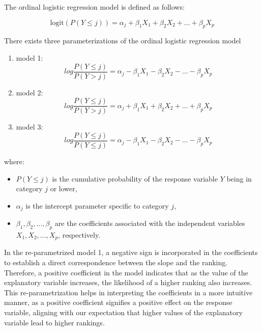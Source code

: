 \documentclass[12pt]{article}
\numberwithin{equation}{section}
\begin{document}
The ordinal logistic regression model is defined as follows:

\begin{equation}
\text{logit}(P(Y \leq j)) = \alpha_j + \beta_1 X_1 + \beta_2 X_2 + \ldots + \beta_p X_p
\label{eq:3.1}
\end{equation}

	There exists three parameterizations of the ordinal logistic regression model 
		\begin{enumerate}
		\item model 1:\\
		\begin{equation}	
	log \frac{P(Y\le j)}{P(Y>j)} = \alpha_j - \beta_1 X_1 - \beta_2 X_2 - \ldots - \beta_p X_p
	\label{eq:3.2}
\end{equation}
		
			\item model 2:\\
			\begin{equation}
			log \frac{P(Y\le j)}{P(Y>j)} = \alpha_j + \beta_1 X_1 + \beta_2 X_2 + \ldots + \beta_p X_p
		\label{eq:3.3}
\end{equation}
			
				\item model 3:\\	
				\begin{equation}
				log \frac{P(Y\le j)}{P(Y\le j)}= \alpha_j - \beta_1 X_1 - \beta_2 X_2 - \ldots - \beta_p X_p
			\label{eq:3.4}
\end{equation}
				\end{enumerate}

	where:
	\begin{itemize}
		\item $P(Y \leq j)$ is the cumulative probability of the response variable $Y$ being in category $j$ or lower,
		\item $\alpha_j$ is the intercept parameter specific to category $j$,
		\item $\beta_1, \beta_2, \ldots, \beta_p$ are the coefficients associated with the independent variables $X_1, X_2, \ldots, X_p$, respectively.
	\end{itemize}
In the re-parametrized model 1, a negative sign is incorporated in the coefficients to establish a direct correspondence between the slope and the ranking. Therefore, a positive coefficient in the model indicates that as the value of the explanatory variable increases, the likelihood of a higher ranking also increases. This re-parametrization helps in interpreting the coefficients in a more intuitive manner, as a positive coefficient signifies a positive effect on the response variable, aligning with our expectation that higher values of the explanatory variable lead to higher rankings.
	
\end{document}
